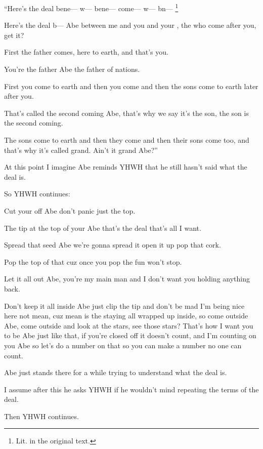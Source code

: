 {
}
{
}
{
	``Here's the deal bene--- w--- bene--- come--- w--- bn---%
	\footnote{Lit.  in the original text.}

	Here's the deal b--- Abe between me and you and your {\cumb},
	the {\cumb} who come after you, get it?
	
	First the father comes, here to earth, and that's you.
	
	You're the father Abe the father of nations.
	
	First you come to earth and then you come
	and then the sons come to earth later after you.

	That's called the second coming Abe,
	that's why we say it's the son, the son is the second coming.

	The sons come to earth and then they come
	and then their sons come too, and that's
	why it's called grand. Ain't it grand Abe?''

	At this point I imagine Abe reminds YHWH that he still hasn't
	said what the deal is.

	So YHWH continues:
	
	Cut your {\dick} off Abe don't panic just the top.
	
	The tip at the top of your {\penisc} Abe that's the
	deal that's all I want.
	
	Spread that seed Abe we're gonna spread it open it
	up pop that cork.
	
	Pop the top of that {\penisd} cuz once you pop the
	fun won't stop.

	Let it all out Abe, you're my main man and I don't
	want you holding anything back.
	
	Don't keep it all inside Abe just clip the tip and
	don't be mad I'm being nice here not mean, cuz mean
	is the {\penisc} staying all wrapped up inside, so
	come outside Abe, come outside and look at the stars,
	see those stars? That's how I want you to be Abe just
	like that, if you're closed off it doesn't count,
	and I'm counting on you Abe so let's do a number
	on that {\penisd} so you can make a number no one
	can count.
	
	Abe just stands there for a while trying to understand
	what the deal is.
	
	I assume after this he asks YHWH if he wouldn't mind
	repeating the terms of the deal.
	
	Then YHWH continues.
}

